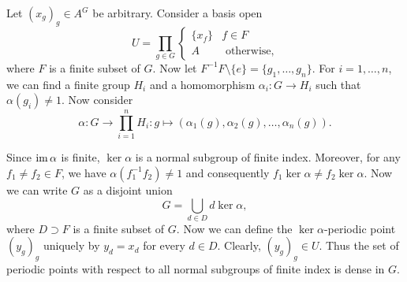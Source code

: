 Let $(x_g)_g \in A^G$ be arbitrary. Consider a basis open
\[
			U= \prod_{g \in G} \begin{cases}
				\{x_f\} & f \in F\\
				A & \text{ otherwise,}
			\end{cases}
			\] 
where $F$ is a finite subset of $G$. Now let $F^{-1}F\setminus\{e\} = \{g_1, \dots, g_n\}$. For $i=1, \dots, n$, we can find a finite group $H_i$ and a homomorphism $\alpha_i:G \to H_i$ such that $\alpha(g_i) \neq 1$. Now consider
\[
	\alpha: G \to \prod_{i=1}^n  H_i: g \mapsto (\alpha_1(g), \alpha_2(g), \dots, \alpha_n(g)).
\]

Since $\operatorname{im} \alpha$ is finite, $\ker \alpha$ is a normal subgroup of finite index. Moreover, for any $f_1 \neq f_2 \in F$, we have $\alpha(f_1^{-1}f_2) \neq 1$ and consequently $f_1 \ker \alpha \neq f_2 \ker \alpha$. Now we can write $G$ as a disjoint union
\[
 	G = \bigcup_{d \in D} d \ker \alpha,
 \] 
 where $D \supset F$ is a finite subset of $G$.
 Now we can define the $\ker \alpha$-periodic point $(y_g)_g$ uniquely by $y_d = x_d$ for every $d \in D$. Clearly, $(y_g)_g \in U$. Thus the set of periodic points with respect to all normal subgroups of finite index is dense in $G$.